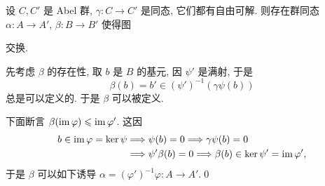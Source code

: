 \begin{Lemma}\label{lem:自由可解1}
	设 $ C,C' $ 是 Abel 群, $ \gamma : C\to C' $ 是同态, 它们都有自由可解. 则存在群同态 $ \alpha : A\to A' $, $ \beta : B\to B' $ 使得图
	\begin{center}
	\end{center}
	交换.
\end{Lemma}
\begin{Proof}
	先考虑 $ \beta $ 的存在性, 取 $ b $ 是 $ B $ 的基元, 因 $ \psi' $ 是满射, 于是
	\[
		\beta(b)=b'\in(\psi')^{-1}(\gamma\psi(b))
	\]
	总是可以定义的. 于是 $ \beta $ 可以被定义.
	\begin{center}
	\end{center}
	下面断言 $ \beta(\mathrm{im}\,\varphi)\leqslant\mathrm{im}\,\varphi' $. 这因
	\[
		\begin{aligned}
			b\in\mathrm{im}\,\varphi=\ker\psi & \Longrightarrow \psi(b)=0\Longrightarrow\gamma\psi(b)=0\\
			&\Longrightarrow\psi'\beta(b)=0\Longrightarrow\beta(b)\in\ker\psi'=\mathrm{im}\,\varphi',
		\end{aligned}
	\]
	于是 $ \beta $ 可以如下诱导 $ \alpha=(\varphi')^{-1}\varphi : A\to A' $.\qed
\end{Proof}

